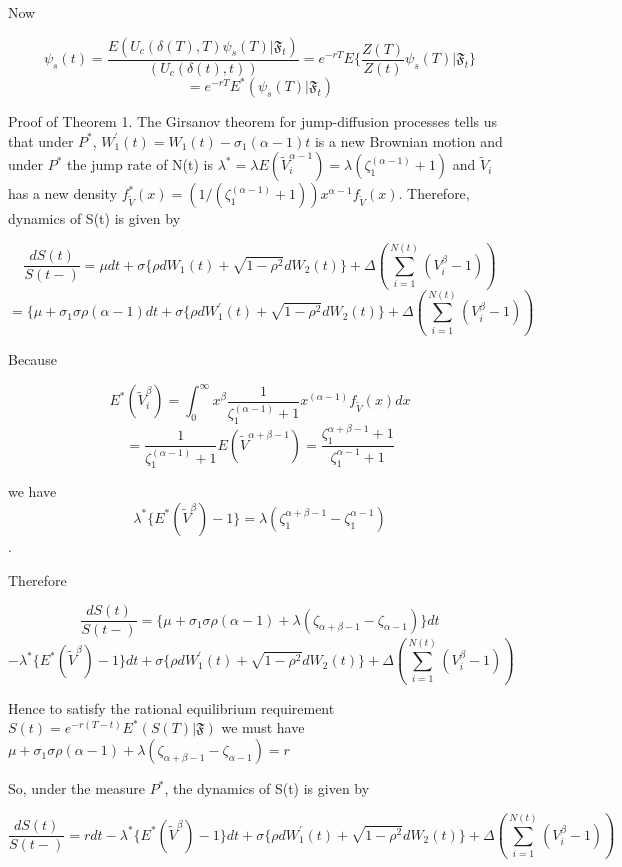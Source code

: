 Now

$$\psi_{s}(t)=\frac{E(U_{c}(\delta(T),T)\psi_{s}(T)|\mathfrak{F}_{t})}{(U_{c}(\delta(t),t))}=e^{-rT}E\{\frac{Z(T)}{Z(t)}\psi_{s}(T)|\mathfrak{F}_{t}\}$$
$$=e^{-rT}E^{*}(\psi_{s}(T)|\mathfrak{F}_{t})$$

Proof of Theorem 1. The Girsanov theorem for jump-diffusion processes tells us that under $P^{*}$, $W_{1}^{\prime}(t)= W_{1}(t)-\sigma_{1}(\alpha-1)t$ is a new Brownian motion and under $P^{*}$ the jump rate of N(t) is $\lambda^{*}=\lambda E(\widetilde{V}_{i}^{\alpha-1})=\lambda (\zeta_{1}^{(\alpha-1)}+1)$ and
$\widetilde{V}_{i}$ has a new density $f_{\widetilde{V}}^{*}(x)=(1/(\zeta_{1}^{(\alpha-1)}+1))x^{\alpha-1}f_{\widetilde{V}}(x)$. Therefore, dynamics of S(t) is given by

$$\frac{dS(t)}{S(t-)}=\mu dt+\sigma\{ \rho dW_{1}(t)+\sqrt{1-\rho^{2}} dW_{2}(t)\} + \Delta (\sum_{i=1}^{N(t)}(V_{i}^{\beta}-1))$$
$$=\{\mu + \sigma_{1}\sigma\rho (\alpha-1)dt + \sigma\{\rho dW_{1}^{\prime}(t)+\sqrt{1-\rho^{2}} dW_{2}(t)\}+ \Delta (\sum_{i=1}^{N(t)}(V_{i}^{\beta}-1))$$

Because

$$E^{*}(\widetilde{V}_{i}^{\beta})=\int_{0}^{\infty}x^{\beta}\frac{1}{\zeta_{1}^{(\alpha-1)}+1}x^{(\alpha-1)}f_{\widetilde{V}}(x)dx$$
$$=\frac{1}{\zeta_{1}^{(\alpha-1)}+1}E(\widetilde{V}^{\alpha+\beta-1})=\frac{\zeta_{1}^{\alpha+\beta-1}+1}{\zeta_{1}^{\alpha-1}+1}$$

we have $$\lambda^{*}\{E^{*}(\widetilde{V}^{\beta})-1\}=\lambda(\zeta_{1}^{\alpha+\beta-1}-\zeta_{1}^{\alpha-1})$$.

Therefore

$$\frac{dS(t)}{S(t-)}=\{\mu + \sigma_{1}\sigma\rho (\alpha-1)+ \lambda(\zeta_{\alpha+\beta-1}-\zeta_{\alpha-1})\}dt$$
$$-\lambda^{*}\{E^{*}(\widetilde{V}^{\beta})-1\}dt+\sigma\{\rho dW_{1}^{\prime}(t)+\sqrt{1-\rho^{2}} dW_{2}(t)\}+ \Delta (\sum_{i=1}^{N(t)}(V_{i}^{\beta}-1))$$

Hence to satisfy the rational equilibrium requirement $S(t)=e^{-r(T-t)}E^{*}(S(T)|\mathfrak{F})$ we must have $\mu + \sigma_{1}\sigma\rho (\alpha-1)+ \lambda(\zeta_{\alpha+\beta-1}-\zeta_{\alpha-1})=r$

So, under the measure $P^{*}$, the dynamics of S(t) is given by

$$\frac{dS(t)}{S(t-)}=rdt-\lambda^{*}\{E^{*}(\widetilde{V}^{\beta})-1\}dt+\sigma\{\rho dW_{1}^{\prime}(t)+\sqrt{1-\rho^{2}} dW_{2}(t)\}+ \Delta (\sum_{i=1}^{N(t)}(V_{i}^{\beta}-1))$$ 